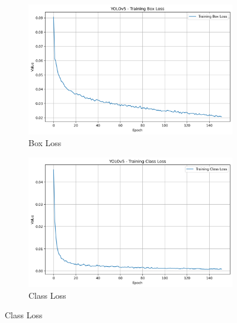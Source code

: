 \documentclass{article}
\begin{document}
\begin{figure}[h!]
  \centering
  \begin{subfigure}[b]{0.495\textwidth}
    \includegraphics[width=\linewidth]{Training Box Loss.png}
    \caption{Box Loss}
  \end{subfigure}
  \begin{subfigure}[b]{0.495\textwidth}
    \includegraphics[width=\linewidth]{Training Class Loss.png}
    \caption{Class Loss}
  \end{subfigure}
\end{figure}
\end{document}
